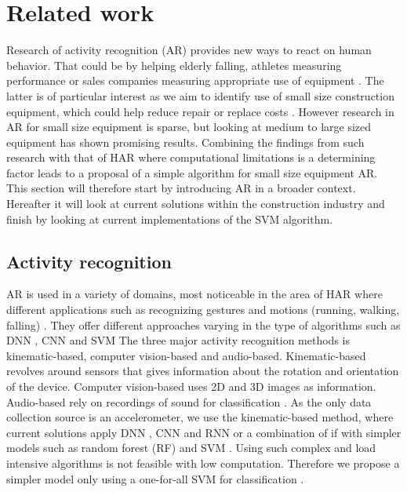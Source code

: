 \section{Related work}
Research of activity recognition (AR) provides new ways to react on human behavior. 
That could be by helping elderly falling, athletes measuring performance or sales companies measuring appropriate use of equipment .
The latter is of particular interest as we aim to identify use of small size construction equipment, which could help reduce repair or replace costs . However research in AR for small size equipment is sparse, but looking at medium to large sized equipment has shown promising results\cite{ConstructionRecognitionFractionalRandomForest,constructionRecognitionMobileSensors,soaWorkersAndEquipment}. Combining the findings from such research with that of HAR \cite{HAR_CNN,DNN_CNN_RNN_HAR,HumanActivityrecognitionAccelerometer,hybridHARSVMCNN} where computational limitations is a determining factor leads to a proposal of a simple algorithm for small size equipment AR. This section will therefore start by introducing AR in a broader context. Hereafter it will look at current solutions within the construction industry and finish by looking at current implementations of the SVM algorithm.
\subsection{Activity recognition}
AR is used in a variety of domains, most noticeable in the area of HAR where different applications such as recognizing gestures and motions (running, walking, falling) \cite{HumanActivityrecognitionAccelerometer, hybridHARSVMCNN,HARsignalprocessing}. 
They offer different approaches varying in the type of algorithms such as DNN \cite{DNN_CNN_RNN_HAR}, CNN \cite{hybridHARSVMCNN} and SVM \cite{hybridHARSVMCNN} 
The three major activity recognition methods is kinematic-based, computer vision-based and audio-based. 
Kinematic-based revolves around sensors that gives information  about the rotation and orientation of the device. 
Computer vision-based uses 2D and 3D images as information. 
Audio-based rely on recordings of sound for classification \cite{soaWorkersAndEquipment}. 
As the only data collection source is an accelerometer, we use the kinematic-based method, where current solutions apply DNN \cite{DNN_CNN_RNN_HAR}, CNN \cite{hybridHARSVMCNN} and RNN \cite{DNN_CNN_RNN_HAR} or a combination of if with simpler models such as random forest (RF) and SVM \cite{hybridHARSVMCNN}. 
Using such complex and load intensive algorithms is not feasible with low computation. Therefore we propose a simpler model only using a one-for-all SVM for classification \cite{SVM-one-vs-one-one-vs-all}. 

